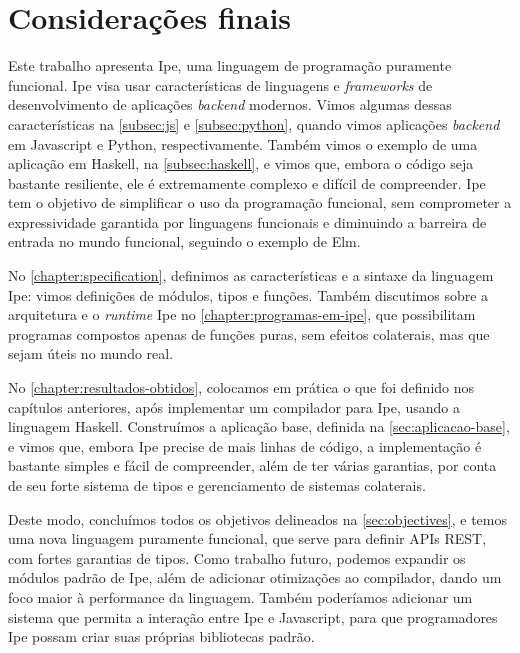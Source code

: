 
\chapter{Considerações finais}

Este trabalho apresenta Ipe, uma linguagem de programação puramente funcional.
Ipe visa usar características de linguagens e \textit{frameworks} de desenvolvimento
de aplicações \textit{backend} modernos. Vimos algumas dessas características na
\autoref{subsec:js} e \autoref{subsec:python}, quando vimos aplicações \textit{backend}
em Javascript e Python, respectivamente. Também vimos o exemplo de uma aplicação
em Haskell, na \autoref{subsec:haskell}, e vimos que, embora o código seja bastante
resiliente, ele é extremamente complexo e difícil de compreender. Ipe tem o objetivo
de simplificar o uso da programação funcional, sem comprometer a expressividade
garantida por linguagens funcionais e diminuindo a barreira de entrada no mundo
funcional, seguindo o exemplo de Elm.

No \autoref{chapter:specification}, definimos as características e a sintaxe da
linguagem Ipe: vimos definições de módulos, tipos e funções. Também discutimos
sobre a arquitetura e o \textit{runtime} Ipe no \autoref{chapter:programas-em-ipe},
que possibilitam programas compostos apenas de funções puras, sem efeitos colaterais,
mas que sejam úteis no mundo real.

No \autoref{chapter:resultados-obtidos}, colocamos em prática o que foi definido
nos capítulos anteriores, após implementar um compilador para Ipe, usando a linguagem Haskell.
Construímos a aplicação base, definida na \autoref{sec:aplicacao-base}, e vimos que, embora Ipe precise
de mais linhas de código, a implementação é bastante simples e fácil de compreender, além de ter
várias garantias, por conta de seu forte sistema de tipos e gerenciamento de sistemas colaterais.

Deste modo, concluímos todos os objetivos delineados na \autoref{sec:objectives}, e temos uma nova
linguagem puramente funcional, que serve para definir APIs REST, com fortes garantias de tipos.
Como trabalho futuro, podemos expandir os módulos padrão de Ipe, além de adicionar otimizações ao
compilador, dando um foco maior à performance da linguagem. Também poderíamos adicionar um sistema
que permita a interação entre Ipe e Javascript, para que programadores Ipe possam criar suas próprias
bibliotecas padrão.
